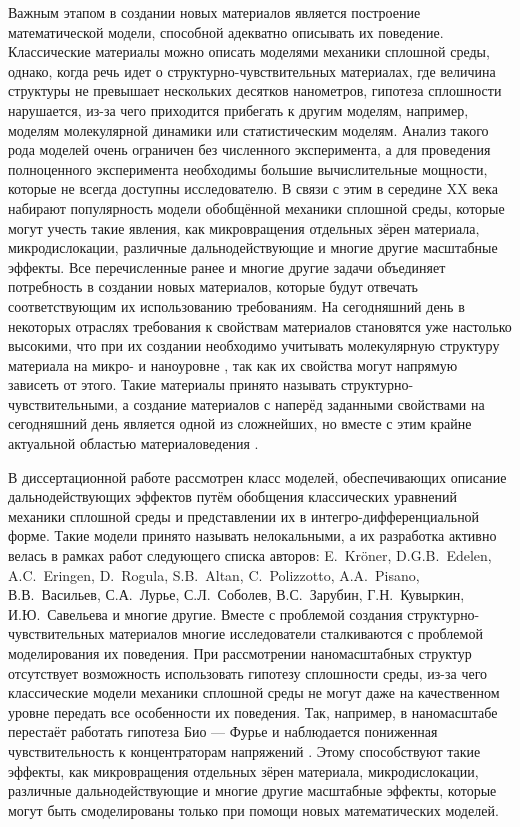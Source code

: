 \ifsynopsis
Важным этапом в создании новых материалов является построение математической модели, способной адекватно описывать их поведение. Классические материалы можно описать моделями механики сплошной среды, однако, когда речь идет о структурно-чувствительных материалах, где величина структуры не превышает нескольких десятков нанометров, гипотеза сплошности нарушается, из-за чего приходится прибегать к другим моделям, например, моделям молекулярной динамики или статистическим моделям. Анализ такого рода моделей очень ограничен без численного эксперимента, а для проведения полноценного эксперимента необходимы большие вычислительные мощности, которые не всегда доступны исследователю. В связи с этим в середине XX века набирают популярность модели обобщённой механики сплошной среды, которые могут учесть такие явления, как микровращения отдельных зёрен материала, микродислокации, различные дальнодействующие и многие другие масштабные эффекты.
\else
Все перечисленные ранее и многие другие задачи объединяет потребность в создании новых материалов, которые будут отвечать соответствующим их использованию требованиям. На сегодняшний день в некоторых отраслях требования к свойствам материалов становятся уже настолько высокими, что при их создании необходимо учитывать молекулярную структуру материала на микро- и наноуровне \cite{MaterialStructure1, MaterialStructure2, MaterialStructure3}, так как их свойства могут напрямую зависеть от этого. Такие материалы принято называть структурно-чувствительными, а создание материалов с наперёд заданными свойствами на сегодняшний день является одной из сложнейших, но вместе с этим крайне актуальной областью материаловедения \cite{Auxetics}.
\fi

\ifsynopsis
В диссертационной работе рассмотрен класс моделей, обеспечивающих описание дальнодействующих эффектов путём обобщения классических уравнений механики сплошной среды и представлении их в интегро-дифференциальной форме. Такие модели принято называть нелокальными, а их разработка активно велась в рамках работ следующего списка авторов: E.~Kr{\"o}ner, D.G.B.~Edelen, A.C.~Eringen, D.~Rogula, S.B.~Altan, C.~Polizzotto, A.A.~Pisano, В.В.~Васильев, С.А.~Лурье, С.Л.~Соболев, В.С.~Зарубин, Г.Н.~Кувыркин, И.Ю.~Савельева и многие другие.
\else
Вместе с проблемой создания структурно-чувствительных материалов многие исследователи сталкиваются с проблемой моделирования их поведения. При рассмотрении наномасштабных структур отсутствует возможность использовать гипотезу сплошности среды, из-за чего классические модели механики сплошной среды не могут даже на качественном уровне передать все особенности их поведения. Так, например, в наномасштабе перестаёт работать гипотеза Био --- Фурье \cite{FourierLaw1, FourierLaw2} и наблюдается пониженная чувствительность к концентраторам напряжений \cite{ConcentrationInsensitive1, ConcentrationInsensitive2}. Этому способствуют такие эффекты, как микровращения отдельных зёрен материала, микродислокации, различные дальнодействующие и многие другие масштабные эффекты, которые могут быть смоделированы только при помощи новых математических моделей.
\fi

